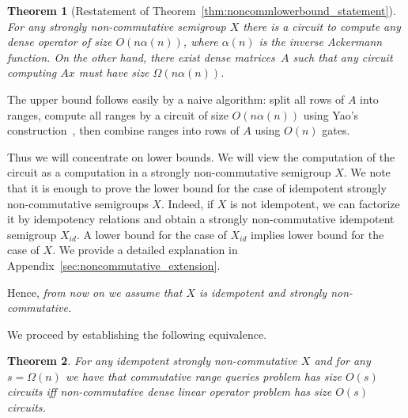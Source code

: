 \documentclass[11pt,letterpaper]{article}
\newtheorem{theorem}{Theorem}
\begin{document}

\begin{theorem}[Restatement of Theorem~\ref{thm:noncommlowerbound_statement}]\label{thm:noncommlowerbound}
For any strongly non-commutative semigroup $X$ there is a circuit to compute any dense operator of size $O(n\alpha(n))$, where $\alpha(n)$ is the inverse Ackermann function. On the other hand, there exist dense matrices~$A$ such that any circuit computing $Ax$ must have size $\Omega(n\alpha(n))$.
\end{theorem}

The upper bound follows easily by a naive algorithm: split all rows of $A$ into ranges, compute all ranges by a circuit of size $O(n\alpha(n))$ using Yao's construction~\cite{DBLP:conf/stoc/Yao82}, then combine ranges into rows of $A$ using $O(n)$ gates.

Thus we will concentrate on lower bounds. We will view the computation of the circuit as a computation in a strongly non-commutative semigroup $X$. We note that it is enough to prove the lower bound for the case of idempotent strongly non-commutative semigroups $X$. Indeed, if $X$ is not idempotent, we can factorize it by idempotency relations and obtain a strongly non-commutative idempotent semigroup $X_{id}$. A lower bound for the case of $X_{id}$ implies lower bound for the case of $X$. We provide a detailed explanation in Appendix~\ref{sec:noncommutative_extension}.

Hence, {\em from now on we assume that $X$ is idempotent and strongly non-commutative.}

We proceed by establishing the following equivalence.

\begin{theorem}\label{thm:equivalence}
For any idempotent strongly non-commutative $X$ and for any $s=\Omega(n)$ we have that commutative range queries problem has size $O(s)$ circuits iff non-commutative dense linear operator problem has size $O(s)$ circuits.
\end{theorem}
\end{document}
